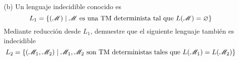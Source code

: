 \begin{enumerate}
	\item[(b)] Un lenguaje indecidible conocido es 
	$$L_1=\{(\mathscr{M})\mid \mathscr{M}\text{ es una TM determinista tal que }L(\mathscr{M})=\varnothing\}$$
	Mediante reducción desde $L_1$, demuestre que el siguiente lenguaje también es indecidible 
	$$L_2=\{(\mathscr{M}_1,\mathscr{M}_2)\mid \mathscr{M}_1,\mathscr{M}_2\text{ son TM deterministas tales que }L(\mathscr{M}_1)=L(\mathscr{M}_2)\}$$

\end{enumerate}
